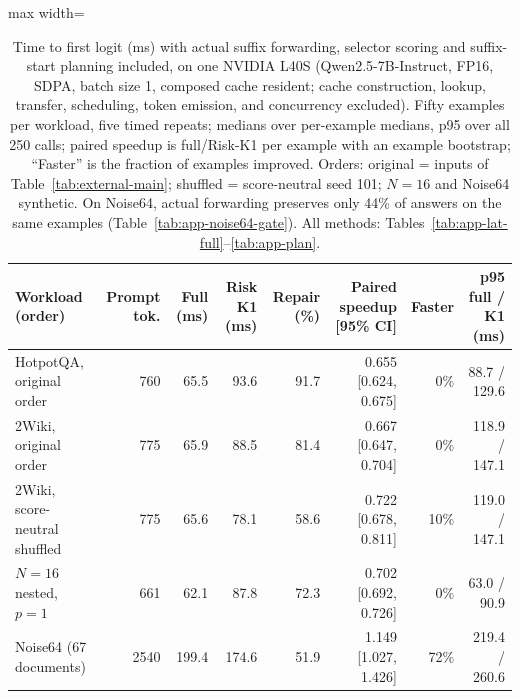 \begin{table}[t]
\centering
\footnotesize
\begin{adjustbox}{max width=\textwidth}
\begin{tabular}{lrrrrrrr}
\toprule
Workload (order) & Prompt tok. & Full (ms) & Risk K1 (ms) & Repair (\%) & Paired speedup [95\% CI] & Faster & p95 full / K1 (ms) \\
\midrule
HotpotQA, original order & 760 & 65.5 & 93.6 & 91.7 & 0.655 [0.624, 0.675] & 0\% & 88.7 / 129.6 \\
2Wiki, original order & 775 & 65.9 & 88.5 & 81.4 & 0.667 [0.647, 0.704] & 0\% & 118.9 / 147.1 \\
2Wiki, score-neutral shuffled & 775 & 65.6 & 78.1 & 58.6 & 0.722 [0.678, 0.811] & 10\% & 119.0 / 147.1 \\
$N{=}16$ nested, $p{=}1$ & 661 & 62.1 & 87.8 & 72.3 & 0.702 [0.692, 0.726] & 0\% & 63.0 / 90.9 \\
Noise64 (67 documents) & 2540 & 199.4 & 174.6 & 51.9 & 1.149 [1.027, 1.426] & 72\% & 219.4 / 260.6 \\
\bottomrule
\end{tabular}
\end{adjustbox}
\caption{Time to first logit (ms) with actual suffix forwarding, selector scoring and suffix-start planning included, on one NVIDIA L40S (Qwen2.5-7B-Instruct, FP16, SDPA, batch size 1, composed cache resident; cache construction, lookup, transfer, scheduling, token emission, and concurrency excluded). Fifty examples per workload, five timed repeats; medians over per-example medians, p95 over all 250 calls; paired speedup is full/Risk-K1 per example with an example bootstrap; ``Faster'' is the fraction of examples improved. Orders: original = inputs of Table~\ref{tab:external-main}; shuffled = score-neutral seed 101; $N{=}16$ and Noise64 synthetic. On Noise64, actual forwarding preserves only 44\% of answers on the same examples (Table~\ref{tab:app-noise64-gate}). All methods: Tables~\ref{tab:app-lat-full}--\ref{tab:app-plan}.}
\label{tab:latency-main}
\end{table}
